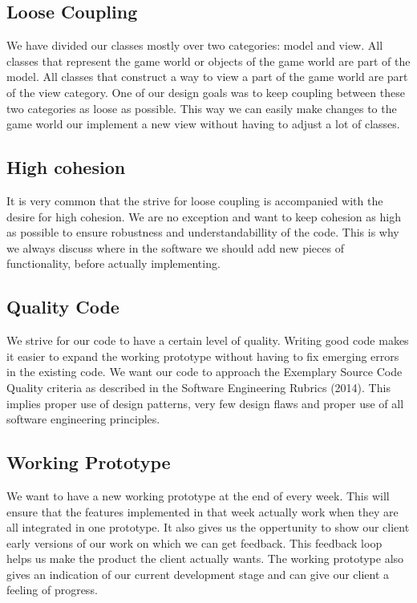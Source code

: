 \subsection{Loose Coupling}

We have divided our classes mostly over two categories: model and view. All classes that represent the game world or objects of the game world are part of the model. All classes that construct a way to view a part of the game world are part of the view category. One of our design goals was to keep coupling between these two categories as loose as possible. This way we can easily make changes to the game world our implement a new view without having to adjust a lot of classes.

\subsection{High cohesion}
It is very common that the strive for loose coupling is accompanied with the desire for high cohesion. We are no exception and want to keep cohesion as high as possible to ensure robustness and understandabillity of the code. This is why we always discuss  where in the software we should add new pieces of functionality, before actually implementing.

\subsection{Quality Code}

We strive for our code to have a certain level of quality. Writing good code makes it easier to expand the working prototype without having to fix emerging errors in the existing code. We want our code to approach the Exemplary Source Code Quality criteria as described in the Software Engineering Rubrics (2014).  This implies proper use of design patterns, very few design flaws and proper use of all software engineering principles. 

\subsection{Working Prototype}

We want to have a new working prototype at the end of every week. This will ensure that the features implemented in that week actually work when they are all integrated in one prototype. It also gives us the oppertunity to show our client early versions of our work on which we can get feedback. This feedback loop helps us make the product the client actually wants. The  working prototype also gives an indication of our current development stage and can give our client a feeling of progress.
